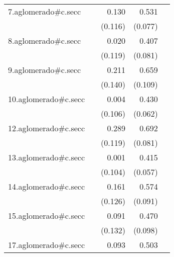 {\begin{longtable}{l*{4}{D{.}{.}{-1}}}
\addlinespace
7.aglomerado#c.secc&                     &       0.130         &       0.531\sym{***}&                     \\
            &                     &     (0.116)         &     (0.077)         &                     \\
\addlinespace
8.aglomerado#c.secc&                     &       0.020         &       0.407\sym{***}&                     \\
            &                     &     (0.119)         &     (0.081)         &                     \\
\addlinespace
9.aglomerado#c.secc&                     &       0.211         &       0.659\sym{***}&                     \\
            &                     &     (0.140)         &     (0.109)         &                     \\
\addlinespace
10.aglomerado#c.secc&                     &       0.004         &       0.430\sym{***}&                     \\
            &                     &     (0.106)         &     (0.062)         &                     \\
\addlinespace
12.aglomerado#c.secc&                     &       0.289\sym{*}  &       0.692\sym{***}&                     \\
            &                     &     (0.119)         &     (0.081)         &                     \\
\addlinespace
13.aglomerado#c.secc&                     &       0.001         &       0.415\sym{***}&                     \\
            &                     &     (0.104)         &     (0.057)         &                     \\
\addlinespace
14.aglomerado#c.secc&                     &       0.161         &       0.574\sym{***}&                     \\
            &                     &     (0.126)         &     (0.091)         &                     \\
\addlinespace
15.aglomerado#c.secc&                     &       0.091         &       0.470\sym{***}&                     \\
            &                     &     (0.132)         &     (0.098)         &                     \\
\addlinespace
17.aglomerado#c.secc&                     &       0.093         &       0.503\sym{***}&                     \\

\end{longtable}}
